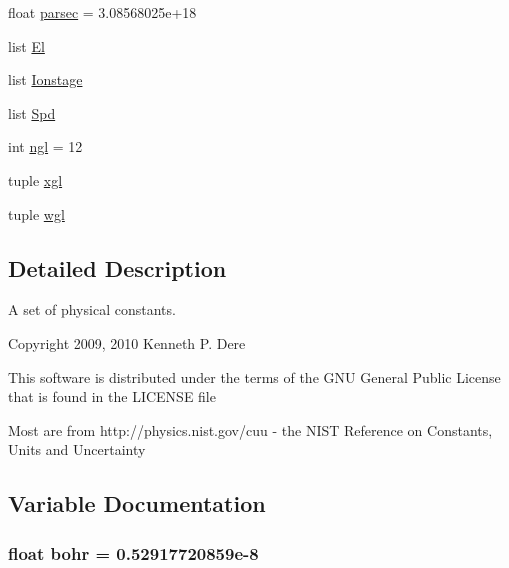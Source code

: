 \begin{DoxyCompactItemize}
$$float \hyperlink{namespacepyneb_1_1utils_1_1__chianti__constants_ab906e57659c35bfb7cd27aeadec38761}{parsec} = 3.\+08568025e+18
\item 
list \hyperlink{namespacepyneb_1_1utils_1_1__chianti__constants_a7ed9977115b347aa369f5d5ccd24a41f}{El}
\item 
list \hyperlink{namespacepyneb_1_1utils_1_1__chianti__constants_a6ba3a6e6b5b9a7296dcff5cd8655c88b}{Ionstage}
\item 
list \hyperlink{namespacepyneb_1_1utils_1_1__chianti__constants_aca66e52cd26761ab6aa375f99100d7c3}{Spd}
\item 
int \hyperlink{namespacepyneb_1_1utils_1_1__chianti__constants_a184d56e78c3d69a92e9136a9b09e5074}{ngl} = 12
\item 
tuple \hyperlink{namespacepyneb_1_1utils_1_1__chianti__constants_af3a02e5ae60445205fcd7a5a940fae65}{xgl}
\item 
tuple \hyperlink{namespacepyneb_1_1utils_1_1__chianti__constants_a194c43506d8baeaec4a0a9bdefdc02d2}{wgl}
\end{DoxyCompactItemize}


\subsection{Detailed Description}
\begin{DoxyVerb}A set of physical constants.

Copyright 2009, 2010 Kenneth P. Dere

This software is distributed under the terms of the GNU General Public License
that is found in the LICENSE file


Most are from http://physics.nist.gov/cuu - the NIST Reference on
Constants, Units and Uncertainty\end{DoxyVerb}
 

\subsection{Variable Documentation}
\hypertarget{namespacepyneb_1_1utils_1_1__chianti__constants_af81bba15e6e6ef0734d798d54cee3c15}{}
\subsubsection[{bohr}]{\setlength{\rightskip}{0pt plus 5cm}float bohr = 0.\+52917720859e-\/8}\label{namespacepyneb_1_1utils_1_1__chianti__constants_af81bba15e6e6ef0734d798d54cee3c15}
\hypertarget{namespacepyneb_1_1utils_1_1__chianti__constants_a17613299a84cc8fd4b1f57b4f255ad33}{}

